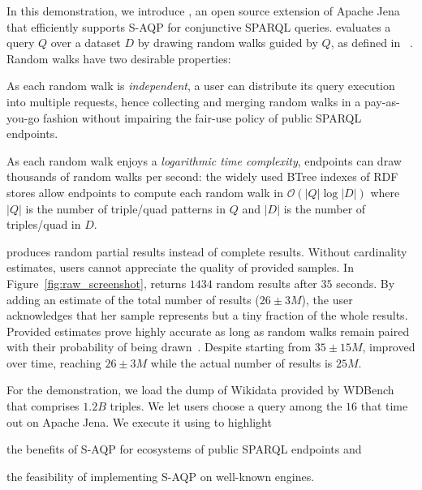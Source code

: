 In this demonstration, we introduce \NAME, an open source extension of
Apache Jena that efficiently supports S-AQP for conjunctive SPARQL
queries. \NAME evaluates a query $Q$ over a dataset $D$ by drawing
random walks guided by $Q$, as defined in
\WANDER~\cite{li2019wanderjoin}. Random walks have two desirable
properties:
\begin{inparaenum}[(i)]
\item As each random walk is \emph{independent}, a user can distribute
  its query execution into multiple requests, hence collecting and
  merging random walks in a pay-as-you-go fashion without impairing
  the fair-use policy of public SPARQL endpoints.
\item As each random walk enjoys a \emph{logarithmic time complexity},
  endpoints can draw thousands of random walks per second: the widely
  used BTree indexes of RDF stores allow endpoints to compute each
  random walk in $\mathcal{O}(|Q| \log |D|)$ where $|Q|$ is the number
  of triple/quad patterns in $Q$ and $|D|$ is the number of
  triples/quad in $D$.
\end{inparaenum}

\NAME produces random partial results instead of complete
results. Without cardinality estimates, users cannot appreciate the
quality of provided samples. In Figure~\ref{fig:raw_screenshot}, \NAME
returns $1434$ random results after $35$ seconds. By adding an
estimate of the total number of results ($26 \pm 3M$), the user
acknowledges that her sample represents but a tiny fraction of the
whole results.  Provided estimates prove highly accurate as long as
random walks remain paired with their probability of being
drawn~\cite{DBLP:conf/sigmod/ParkKBKHH20}. Despite starting from $35
\pm 15M$, \NAME improved over time, reaching $26\pm 3M$ while the
actual number of results is $25M$.

For the demonstration, we load the dump of Wikidata provided by
WDBench~\cite{angles2022wdbench} that comprises $1.2B$ triples.  We
let users choose a query among the $16$ that time out on Apache
Jena. We execute it using \NAME to highlight
\begin{inparaenum}[(i)]
\item the benefits of S-AQP for ecosystems of public SPARQL endpoints
  and
\item the feasibility of implementing S-AQP on well-known engines.
\end{inparaenum}

%


